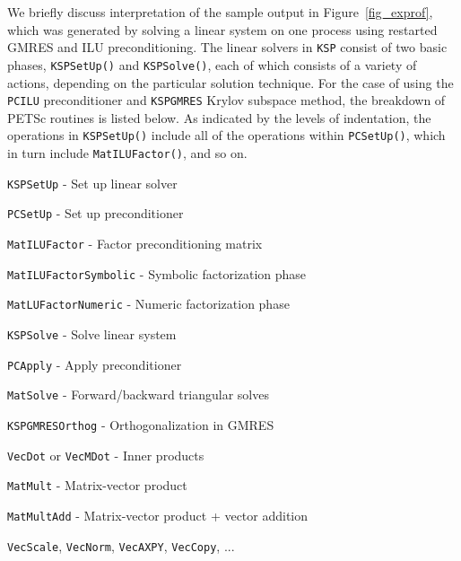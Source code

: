 We briefly discuss interpretation of the sample output in
Figure~\ref{fig_exprof}, which was generated by solving a linear
system on one process using restarted GMRES and ILU
preconditioning.  The linear solvers in \lstinline{KSP} consist of two
basic phases, \lstinline{KSPSetUp()} and \lstinline{KSPSolve()}, each of which
consists of a variety of actions, depending on the particular
solution technique.
For the case of using the \lstinline{PCILU} preconditioner and \lstinline{KSPGMRES}
Krylov subspace method, the breakdown of PETSc routines is listed below.
As indicated by the levels of indentation, the
operations in \lstinline{KSPSetUp()} include all of the operations within
\lstinline{PCSetUp()}, which in turn include \lstinline{MatILUFactor()}, and so on.
\begin{tightitemize}
  \item \lstinline{KSPSetUp} - Set up linear solver
   \begin{tightitemize}
     \item \lstinline{PCSetUp} - Set up preconditioner
    \begin{tightitemize}
      \item \lstinline{MatILUFactor} - Factor preconditioning matrix
      \begin{tightitemize}
        \item \lstinline{MatILUFactorSymbolic} - Symbolic factorization phase
        \item \lstinline{MatLUFactorNumeric} - Numeric factorization phase
      \end{tightitemize}
    \end{tightitemize}
\end{tightitemize}
 \item \lstinline{KSPSolve} - Solve linear system
   \begin{tightitemize}
     \item \lstinline{PCApply} - Apply preconditioner
    \begin{tightitemize}
      \item \lstinline{MatSolve} - Forward/backward triangular solves
    \end{tightitemize}
  \item \lstinline{KSPGMRESOrthog} - Orthogonalization in GMRES
    \begin{tightitemize}
      \item \lstinline{VecDot} or \lstinline{VecMDot} - Inner products
    \end{tightitemize}
  \item \lstinline{MatMult} - Matrix-vector product
  \item \lstinline{MatMultAdd} - Matrix-vector product + vector addition
    \begin{tightitemize}
      \item \lstinline{VecScale}, \lstinline{VecNorm}, \lstinline{VecAXPY}, \lstinline{VecCopy}, ...
    \end{tightitemize}
  \end{tightitemize}
\end{tightitemize}

